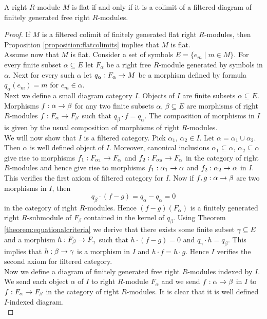 \begin{theorem}\label{theorem:Lazardstheorem}
A right $R$-module $M$ is flat if and only if it is a colimit of a filtered diagram of finitely generated free right $R$-modules.
\end{theorem}
\begin{proof}
If $M$ is a filtered colimit of finitely generated flat right $R$-modules, then Proposition \ref{proposition:flatcolimits} implies that $M$ is flat.\\
Assume now that $M$ is flat. Consider a set of symbols $E=\{e_m\mid m\in M\}$. For every finite subset $\alpha\subseteq E$ let $F_{\alpha}$ be a right free $R$-module generated by symbols in $\alpha$. Next for every such $\alpha$ let $q_{\alpha}:F_{\alpha}\rightarrow M$ be a morphism defined by formula $q_{\alpha}(e_m)=m$ for $e_m\in \alpha$.\\
Next we define a  small diagram category $I$. Objects of $I$ are finite subsets $\alpha\subseteq E$. Morphisms $f:\alpha\rightarrow \beta$ for any two finite subsets $\alpha$, $\beta\subseteq E$ are morphisms of right $R$-modules $f:F_{\alpha}\rightarrow F_{\beta}$ such that $q_{\beta}\cdot f=q_{\alpha}$. The composition of morphisms in $I$ is given by the usual composition of morphisms of right $R$-modules.\\
We will now show that $I$ is a filtered category. Pick $\alpha_1$, $\alpha_2\in I$. Let $\alpha=\alpha_1\cup \alpha_2$. Then $\alpha$ is well defined object of $I$. Moreover, canonical inclusions $\alpha_1\subseteq \alpha$, $\alpha_2\subseteq \alpha$ give rise to morphisms $f_1:F_{\alpha_1}\rightarrow F_{\alpha}$ and $f_2:F_{\alpha_2}\rightarrow F_{\alpha}$ in the category of right $R$-modules and hence give rise to morphisms $f_1:\alpha_1\rightarrow \alpha$ and $f_2:\alpha_2\rightarrow \alpha$ in $I$. This verifies the first axiom of filtered category for $I$. Now if $f,g:\alpha\rightarrow \beta$ are two morphisms in $I$, then $$q_{\beta}\cdot (f-g)=q_{\alpha}-q_{\alpha}=0$$
in the category of right $R$-modules. Hence $(f-g)(F_{\alpha})$ is a finitely generated right $R$-submodule of $F_{\beta}$ contained in the kernel of $q_{\beta}$. Using Theorem \ref{theorem:equationalcriteria} we derive that there exists some finite subset $\gamma\subseteq E$ and a morphism $h:F_{\beta}\rightarrow F_{\gamma}$ such that $h\cdot (f-g)=0$ and $q_{\gamma}\cdot h=q_{\beta}$. This implies that $h:\beta\rightarrow \gamma$ is a morphism in $I$ and $h\cdot f=h\cdot g$. Hence $I$ verifies the second axiom for filtered category.\\
Now we define a diagram of finitely generated free right $R$-modules indexed by $I$. We send each object $\alpha$ of $I$ to right $R$-module $F_{\alpha}$ and we send $f:\alpha\rightarrow \beta$ in $I$ to $f:F_{\alpha}\rightarrow F_{\beta}$ in the category of right $R$-modules. It is clear that it is well defined $I$-indexed diagram.\\

\end{proof}
